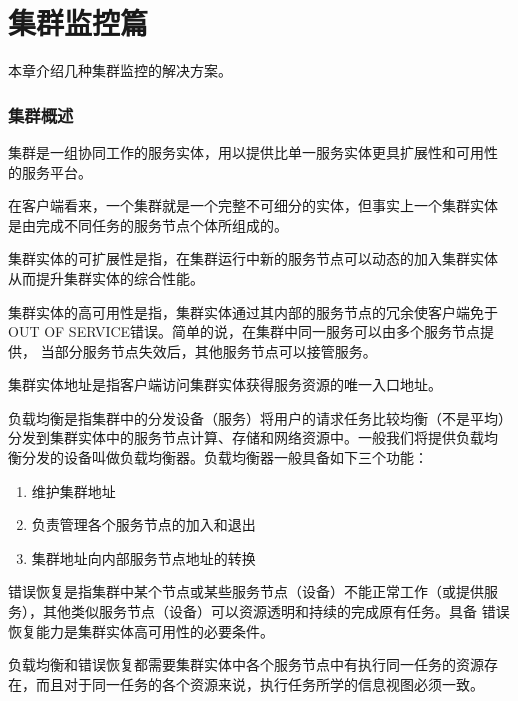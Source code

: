 \part{集群监控篇}

本章介绍几种集群监控的解决方案。



\section{集群概述}

集群是一组协同工作的服务实体，用以提供比单一服务实体更具扩展性和可用性
的服务平台。

在客户端看来，一个集群就是一个完整不可细分的实体，但事实上一个集群实体
是由完成不同任务的服务节点个体所组成的。

集群实体的可扩展性是指，在集群运行中新的服务节点可以动态的加入集群实体
从而提升集群实体的综合性能。

集群实体的高可用性是指，集群实体通过其内部的服务节点的冗余使客户端免于
OUT OF SERVICE错误。简单的说，在集群中同一服务可以由多个服务节点提供，
当部分服务节点失效后，其他服务节点可以接管服务。

集群实体地址是指客户端访问集群实体获得服务资源的唯一入口地址。

负载均衡是指集群中的分发设备（服务）将用户的请求任务比较均衡（不是平均）
分发到集群实体中的服务节点计算、存储和网络资源中。一般我们将提供负载均
衡分发的设备叫做负载均衡器。负载均衡器一般具备如下三个功能：

\begin{enumerate}[itemsep=0pt,parsep=0pt]
\item 维护集群地址
\item 负责管理各个服务节点的加入和退出
\item 集群地址向内部服务节点地址的转换
\end{enumerate}

错误恢复是指集群中某个节点或某些服务节点（设备）不能正常工作（或提供服
  务），其他类似服务节点（设备）可以资源透明和持续的完成原有任务。具备
错误恢复能力是集群实体高可用性的必要条件。

负载均衡和错误恢复都需要集群实体中各个服务节点中有执行同一任务的资源存
在，而且对于同一任务的各个资源来说，执行任务所学的信息视图必须一致。

